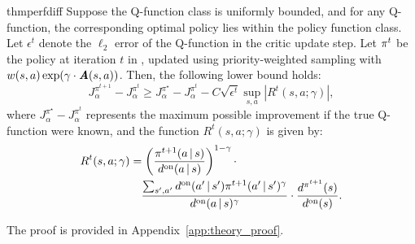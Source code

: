 \begin{restatable}[]{thm}{perfdiff}\label{thm:perfdiff} 
Suppose the Q-function class is uniformly bounded, and for any Q-function, the corresponding optimal policy lies within the policy function class.  
Let $\epsilon^t$ denote the $\ell_2$ error of the Q-function in the critic update step.  
Let $\pi^t$ be the policy at iteration $t$ in \algname, updated using priority-weighted sampling with $w(s,a)\exp(\gamma\cdot\textbf{\em A}(s,a))$. Then, the following lower bound holds:
\begin{equation*}
    J_{\alpha}^{\pi^{t+1}} - J_{\alpha}^{\pi^t} \geq J_{\alpha}^{\pi^\star} - J_{\alpha}^{\pi^t} - C \sqrt{\epsilon^t} \sup_{s, a} \left| R^t(s, a;\gamma) \right|,
\end{equation*}
where $J_{\alpha}^{\pi^\star} - J_{\alpha}^{\pi^t}$ represents the maximum possible improvement if the true Q-function were known, and the function $R^t(s, a;\gamma)$ is given by:
\begin{align*}
    R^t(s, a;\gamma) &= \left(\frac{{\pi^{t+1}}(a{\,|\,} s)}{d^{\text{on}}(a{\,|\,} s)}\right)^{1-\gamma} \cdot \\ 
    &\quad \frac{\sum_{s', a'}d^{\text{on}}(a'{\,|\,} s') \pi^{t+1}(a'{\,|\,} s')^\gamma}{d^{\text{on}}(a{\,|\,} s)^\gamma} \cdot \frac{d^{\pi^{t+1}}(s)}{d^{\text{on}}(s)}.
\end{align*}
\end{restatable}
The proof is provided in Appendix~\ref{app:theory_proof}.



